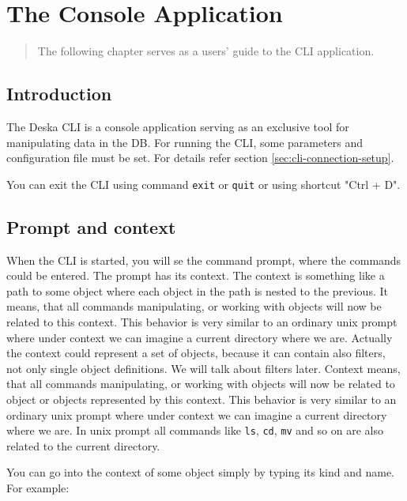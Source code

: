 \documentclass[deska]{subfiles}
\begin{document}
\chapter{The Console Application}
\label{sec:cli-usage}

\begin{abstract}
The following chapter serves as a users' guide to the CLI application.
\end{abstract}


\section{Introduction}

The Deska CLI is a console application serving as an exclusive tool for manipulating data in the DB. For running the
CLI, some parameters and configuration file must be set. For details refer section \ref{sec:cli-connection-setup}.

You can exit the CLI using command {\tt exit} or {\tt quit} or using shortcut "Ctrl + D".

\section{Prompt and context}

When the CLI is started, you will se the command prompt, where the commands could be entered. The prompt has its context.
The context is something like a path to some object where each object in the path is nested to the previous. 
It means, that all commands manipulating, or working with objects will now be related to this context. This behavior
is very similar to an ordinary unix prompt where under context we can imagine a current directory where we are. Actually the
context could represent a set of objects, because it can contain also filters, not only single object definitions.
We will talk about filters later. Context means, that all commands manipulating, or working with objects will now be related to
object or objects represented by this context. This behavior is very similar to an ordinary unix prompt where under context
we can imagine a current directory where we are. In unix prompt all commands like {\tt ls}, {\tt cd}, {\tt mv} and so on
are also related to the current directory.

You can go into the context of some object simply by typing its kind and name. For example:
\end{document}
